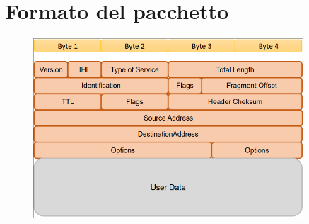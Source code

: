 \documentclass{report}
\begin{document}
    \section{Formato del pacchetto}
         \begin{figure}[H]
            \includegraphics[width=0.9\textwidth]{1/PCI.png}
        \end{figure}
\end{document}
